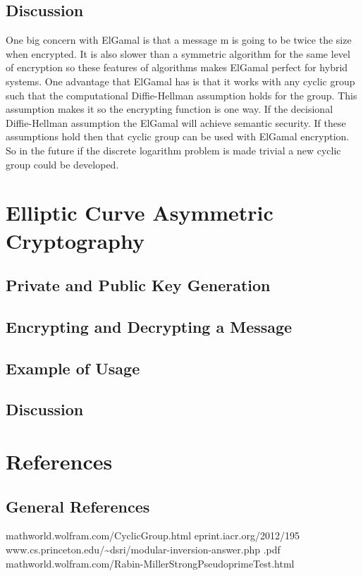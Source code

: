 \documentclass[conference]{IEEEtran}
\begin{document}
\subsection{Discussion}
One big concern with ElGamal is that a message m is going to be twice the size when encrypted. It is also slower than a symmetric algorithm for the same level of encryption so these features of algorithms makes ElGamal perfect for hybrid systems. \newline \indent
One advantage that ElGamal has is that it works with any cyclic group such that the computational Diffie-Hellman assumption holds for the group. This assumption makes it so the encrypting function is one way. If the decisional Diffie-Hellman assumption the ElGamal will achieve semantic security. If these assumptions hold then that cyclic group can be used with ElGamal encryption. So in the future if the discrete logarithm problem is made trivial a new cyclic group could be developed.
\color{red}
\section{Elliptic Curve Asymmetric Cryptography}

\subsection{Private and Public Key Generation}

\subsection{Encrypting and Decrypting a Message}

\subsection{Example of Usage}

\subsection{Discussion}


\color{black}
\section{References}
\subsection{General References}
mathworld.wolfram.com/CyclicGroup.html \newline
eprint.iacr.org/2012/195
www.cs.princeton.edu/\textasciitilde dsri/modular-inversion-answer.php \newline.pdf \newline
mathworld.wolfram.com/Rabin-MillerStrongPseudoprimeTest.html \newline
\end{document}
